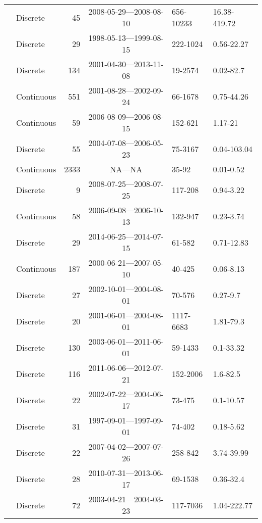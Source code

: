 \begin{longtable}{llrcll}
  \citet{lter2008} & Discrete &  45 & 2008-05-29---2008-08-10 & 656-10233 & 16.38-419.72 \\ 
  \citet{lter5653} & Discrete &  29 & 1998-05-13---1999-08-15 & 222-1024 & 0.56-22.27 \\ 
  \citet{lter5689} & Discrete & 134 & 2001-04-30---2013-11-08 & 19-2574 & 0.02-82.7 \\ 
  \citet{Markager2011} & Continuous & 551 & 2001-08-28---2002-09-24 & 66-1678 & 0.75-44.26 \\ 
  \citet{Massicotte2011EA} & Continuous &  59 & 2006-08-09---2006-08-15 & 152-621 & 1.17-21 \\ 
  \citet{Moran2006} & Discrete &  55 & 2004-07-08---2006-05-23 & 75-3167 & 0.04-103.04 \\ 
  \citet{Nelson2002, Nelson2007, Nelson2010} & Continuous & 2333 & NA---NA & 35-92 & 0.01-0.52 \\ 
  \citet{Nguyen2010} & Discrete &   9 & 2008-07-25---2008-07-25 & 117-208 & 0.94-3.22 \\ 
  \citet{Norman2011} & Continuous &  58 & 2006-09-08---2006-10-13 & 132-947 & 0.23-3.74 \\ 
  \citet{Oestreich2016} & Discrete &  29 & 2014-06-25---2014-07-15 & 61-582 & 0.71-12.83 \\ 
  \citet{Osburn2007} & Continuous & 187 & 2000-06-21---2007-05-10 & 40-425 & 0.06-8.13 \\ 
  \citet{Osburn2009} & Discrete &  27 & 2002-10-01---2004-08-01 & 70-576 & 0.27-9.7 \\ 
  \citet{Osburn2011a} & Discrete &  20 & 2001-06-01---2004-08-01 & 1117-6683 & 1.81-79.3 \\ 
  \citet{Osburn2016} & Discrete & 130 & 2003-06-01---2011-06-01 & 59-1433 & 0.1-33.32 \\ 
  \citet{Polaris2012} & Discrete & 116 & 2011-06-06---2012-07-21 & 152-2006 & 1.6-82.5 \\ 
  \citet{Retamal2007} & Discrete &  22 & 2002-07-22---2004-06-17 & 73-475 & 0.1-10.57 \\ 
  \citet{Seritti1998} & Discrete &  31 & 1997-09-01---1997-09-01 & 74-402 & 0.18-5.62 \\ 
  \citet{shank2009} & Discrete &  22 & 2007-04-02---2007-07-26 & 258-842 & 3.74-39.99 \\ 
  \citet{Shen2014} & Discrete &  28 & 2010-07-31---2013-06-17 & 69-1538 & 0.36-32.4 \\ 
  \citet{Sickman2010} & Discrete &  72 & 2003-04-21---2004-03-23 & 117-7036 & 1.04-222.77 \\ 

\end{longtable}
